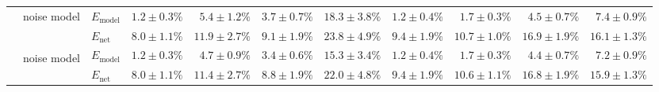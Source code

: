 \begin{sidewaystable}
\begin{tabular}{p{2.2cm} p{1.7cm} l r r r r r r r r }
	\\\cmidrule(l){2-11}
	&
	\multirow{2}{1.7cm}{\raggedleft %
	noise model} &
	$E_\mathrm{model}$ & 
	\color{Gray}$1.2 \pm 0.3\%$ & \color{Gray}$5.4 \pm 1.2\%$ & \color{Gray}$3.7 \pm 0.7\%$ & \color{Gray}$18.3 \pm 3.8\%$ & \color{Gray}$1.2 \pm 0.4\%$ & \color{Gray}$1.7 \pm 0.3\%$ & \color{Gray}$4.5 \pm 0.7\%$ & \color{Gray}$7.4 \pm 0.9\%$
	\\
	& & 
	$E_\mathrm{net}$ &
	\cellcolor{White!38!SteelBlue}$8.0 \pm 1.1\%$ & \cellcolor{White!32!SteelBlue}$11.9 \pm 2.7\%$ & \cellcolor{White!44!SteelBlue}$9.1 \pm 1.9\%$ & \cellcolor{White!38!SteelBlue}$23.8 \pm 4.9\%$ & \cellcolor{White!25!SteelBlue}$9.4 \pm 1.9\%$ & \cellcolor{White!7!SteelBlue}$10.7 \pm 1.0\%$ & \cellcolor{White!7!SteelBlue}$16.9 \pm 1.9\%$ & \cellcolor{White!7!SteelBlue}$16.1 \pm 1.3\%$
	\\\cmidrule(l){2-11}
	&
	\multirow{2}{1.7cm}{\raggedleft %
	noise model\textsuperscript{\dag}} &
	$E_\mathrm{model}$ & 
	\color{Gray}$1.2 \pm 0.3\%$ & \color{Gray}$4.7 \pm 0.9\%$ & \color{Gray}$3.4 \pm 0.6\%$ & \color{Gray}$15.3 \pm 3.4\%$ & \color{Gray}$1.2 \pm 0.4\%$ & \color{Gray}$1.7 \pm 0.3\%$ & \color{Gray}$4.4 \pm 0.7\%$ & \color{Gray}$7.2 \pm 0.9\%$
	\\
	& & 
	$E_\mathrm{net}$ &
	\cellcolor{White!32!SteelBlue}$8.0 \pm 1.1\%$ & \cellcolor{White!38!SteelBlue}$11.4 \pm 2.7\%$ & \cellcolor{White!50!SteelBlue}$8.8 \pm 1.9\%$ & \cellcolor{White!57!SteelBlue}$22.0 \pm 4.8\%$ & \cellcolor{White!19!SteelBlue}$9.4 \pm 1.9\%$ & \cellcolor{White!13!SteelBlue}$10.6 \pm 1.1\%$ & \cellcolor{White!13!SteelBlue}$16.8 \pm 1.9\%$ & \cellcolor{White!13!SteelBlue}$15.9 \pm 1.3\%$
	\\
	\bottomrule
	\end{tabular}
\end{sidewaystable}


